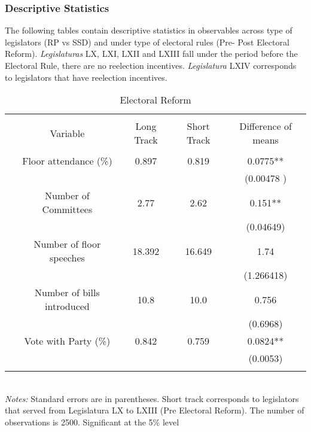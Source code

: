 \documentclass{article}
\begin{document}
\subsubsection*{Descriptive Statistics}
The following tables contain descriptive statistics in observables across type of legislators (RP vs SSD) and under type of electoral rules (Pre- Post Electoral Reform). \textit{Legislaturas} LX, LXI, LXII and LXIII fall under the period before the Electoral Rule, there are no reelection incentives. \textit{Legislatura} LXIV corresponds to legislators that have reelection incentives.   
\begin{table}[!htbp] \centering 
	\caption{Electoral Reform}
	\begin{tabular}{@{\extracolsep{4pt}} ccccc} 
		\\[-1.8ex]\hline 
		\hline \\[-1.8ex] 
		& Variable & Long Track  & Short Track & Difference of means  \\ 
		\hline \\[-1.8ex] 
		& Floor attendance (\%) & 0.897  & 0.819 &  0.0775** \\ 
		& &   &  &  (0.00478 ) \\ 
		& Number of Committees   &  2.77   &2.62 &  0.151**  \\ 
		& &   &  & (0.04649)  \\ 
		& Number of floor speeches   &  18.392 &16.649  &  1.74 \\ 
		& &   &  &  (1.266418) \\ 
		& Number of bills introduced  &  10.8  & 10.0 &  0.756 \\ 
		& &   &  & (0.6968)  \\ 
		& Vote with Party (\%)   &  0.842  & 0.759   &  0.0824** \\ 
		& &   &  &   (0.0053)\\ 
		\hline \\[-1.8ex] 
	\end{tabular} 
	\\
	\textit{Notes:} Standard errors are in parentheses. Short track corresponds to legislators that served from Legislatura LX to LXIII (Pre Electoral Reform). The number of observations is 2500. Significant at the 5\% level 
\end{table} 
\end{document}
